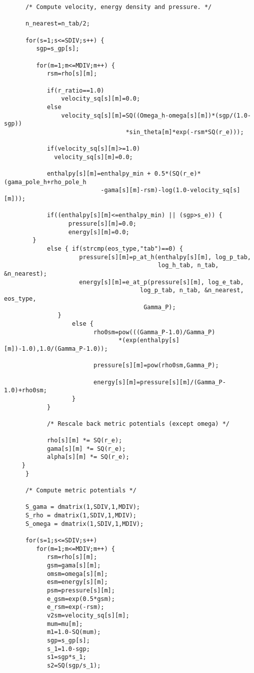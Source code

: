 \begin{verbatim}
      /* Compute velocity, energy density and pressure. */
 
      n_nearest=n_tab/2; 

      for(s=1;s<=SDIV;s++) {
         sgp=s_gp[s];

         for(m=1;m<=MDIV;m++) {
            rsm=rho[s][m];
            
            if(r_ratio==1.0) 
                velocity_sq[s][m]=0.0;
            else 
                velocity_sq[s][m]=SQ((Omega_h-omega[s][m])*(sgp/(1.0-sgp))
                                  *sin_theta[m]*exp(-rsm*SQ(r_e)));

            if(velocity_sq[s][m]>=1.0) 
              velocity_sq[s][m]=0.0;

            enthalpy[s][m]=enthalpy_min + 0.5*(SQ(r_e)*(gama_pole_h+rho_pole_h
                           -gama[s][m]-rsm)-log(1.0-velocity_sq[s][m]));
  
            if((enthalpy[s][m]<=enthalpy_min) || (sgp>s_e)) {
                  pressure[s][m]=0.0;
                  energy[s][m]=0.0; 
	    }
            else { if(strcmp(eos_type,"tab")==0) {
                     pressure[s][m]=p_at_h(enthalpy[s][m], log_p_tab, 
                                           log_h_tab, n_tab, &n_nearest);
                     energy[s][m]=e_at_p(pressure[s][m], log_e_tab, 
                                      log_p_tab, n_tab, &n_nearest, eos_type,
                                       Gamma_P);
	           }
                   else {
                         rho0sm=pow(((Gamma_P-1.0)/Gamma_P)
                                *(exp(enthalpy[s][m])-1.0),1.0/(Gamma_P-1.0));
 
                         pressure[s][m]=pow(rho0sm,Gamma_P);

                         energy[s][m]=pressure[s][m]/(Gamma_P-1.0)+rho0sm;
                   }
            }  

            /* Rescale back metric potentials (except omega) */

            rho[s][m] *= SQ(r_e);
            gama[s][m] *= SQ(r_e);
            alpha[s][m] *= SQ(r_e);
	 }
      }

      /* Compute metric potentials */

      S_gama = dmatrix(1,SDIV,1,MDIV);
      S_rho = dmatrix(1,SDIV,1,MDIV);
      S_omega = dmatrix(1,SDIV,1,MDIV);

      for(s=1;s<=SDIV;s++)
         for(m=1;m<=MDIV;m++) {
            rsm=rho[s][m];
            gsm=gama[s][m];
            omsm=omega[s][m];
            esm=energy[s][m];
            psm=pressure[s][m];
            e_gsm=exp(0.5*gsm);
            e_rsm=exp(-rsm);
            v2sm=velocity_sq[s][m];
            mum=mu[m];            
            m1=1.0-SQ(mum);
            sgp=s_gp[s];
            s_1=1.0-sgp;
            s1=sgp*s_1;
            s2=SQ(sgp/s_1);  


\end{verbatim}
